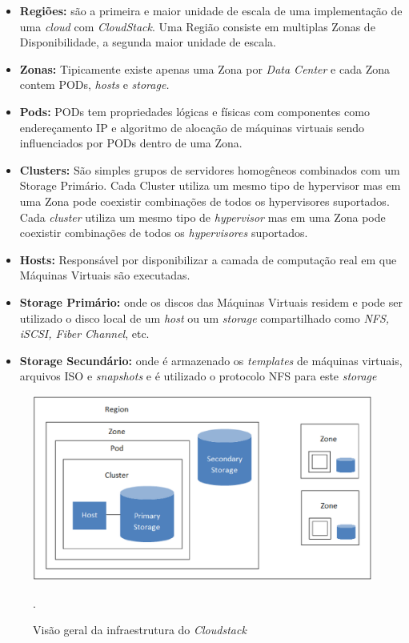 \begin{itemize}
\item \textbf{Regiões:} são a primeira e maior unidade de escala de uma implementação de uma \textit{cloud} com \textit{CloudStack}. Uma Região consiste em multiplas Zonas de Disponibilidade, a segunda maior unidade de escala.
\item \textbf{Zonas: } Tipicamente existe apenas uma Zona por \textit{Data Center} e cada Zona contem PODs, \textit{hosts} e \textit{storage.}
\item \textbf{Pods: } PODs tem propriedades lógicas e físicas com componentes como endereçamento IP e algoritmo de alocação de máquinas virtuais sendo influenciados por PODs dentro de uma Zona.
\item \textbf{Clusters: } São simples grupos de servidores homogêneos combinados com um Storage Primário. Cada Cluster utiliza um mesmo tipo de hypervisor mas em uma Zona pode coexistir combinações de todos os hypervisores suportados. Cada \textit{cluster} utiliza um mesmo tipo de \textit{hypervisor} mas em uma Zona pode coexistir combinações de todos os \textit{hypervisores} suportados.
\item \textbf{Hosts: } Responsável por disponibilizar a camada de computação real em que Máquinas Virtuais são executadas.
\item \textbf{Storage Primário: }  onde os discos das Máquinas Virtuais residem e pode ser utilizado o disco local de um \textit{host} ou um \textit{storage} compartilhado como \textit{NFS, iSCSI, Fiber Channel}, etc.
\item \textbf{Storage Secundário:} onde é armazenado os \textit{templates} de máquinas virtuais, arquivos ISO e \textit{snapshots} e é utilizado o protocolo NFS para este \textit{storage}
\end{itemize}


\begin{figure}[!htb]
\centering
\includegraphics [keepaspectratio=true,scale=0.60]{figuras/cloudstack_structure.eps}
\caption{Visão geral da infraestrutura do \textit{Cloudstack}}
\cite{cloudstack}.
\label{diagramacloudstack}
\end{figure}

